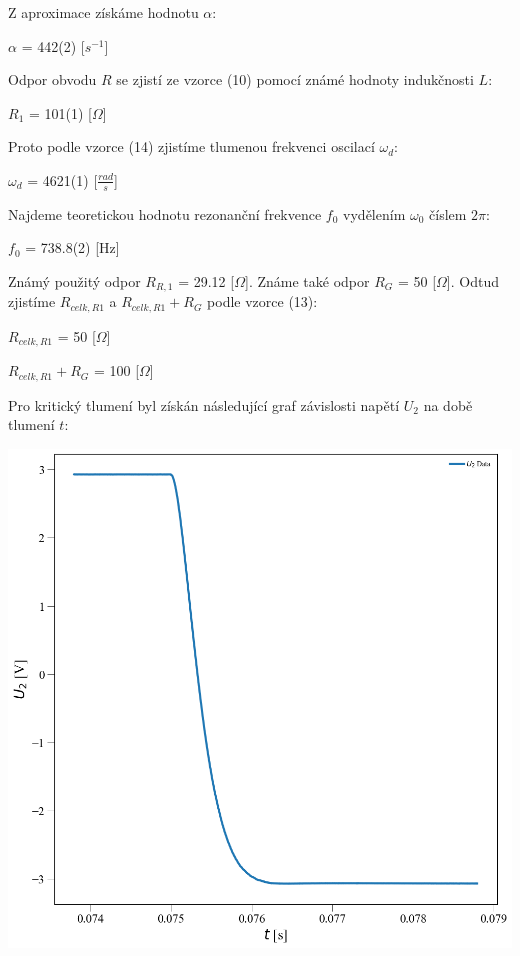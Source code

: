 \documentclass[a4paper,11pt]{article}
\begin{document}
\begin{minipage}[t]{0.5\textwidth} 
                Z aproximace získáme hodnotu $\alpha$: 
                \begin{center}
                    $\alpha$ = 442(2) [$s^{-1}$]
                \end{center}
                Odpor obvodu $R$ se zjistí ze vzorce (10) pomocí známé hodnoty indukčnosti $L$:
                \begin{center}
                    $R_1$ = 101(1) [$\Omega$]
                \end{center}
                Proto podle vzorce (14) zjistíme tlumenou frekvenci oscilací $\omega_d$:
                \begin{center}
                    $\omega_d$ = 4621(1) [$\frac{rad}{s}$]
                \end{center}
                Najdeme teoretickou hodnotu rezonanční frekvence $f_0$ vydělením $\omega_0$ číslem $2 \pi$:
                \begin{center}
                    $f_0$ = 738.8(2) [Hz]
                \end{center}
                Známý použitý odpor $R_{R,1}$ = 29.12 [$\Omega$]. Známe také odpor $R_G$ = 50 [$\Omega$]. Odtud zjistíme $R_{celk, R1}$ a $R_{celk, R1} + R_G$ podle vzorce (13):
                \begin{center}
                    $R_{celk, R1}$ = 50 [$\Omega$]
                    \vspace{5pt}
                    \par $R_{celk, R1} + R_G$ = 100 [$\Omega$]
                \end{center}
                Pro kritický tlumení byl získán následující graf závislosti napětí $U_2$ na době tlumení $t$:
                \par \centering
                \vspace{10pt}
                \includegraphics[scale=0.3]{krit}

\end{minipage}
\end{document}
